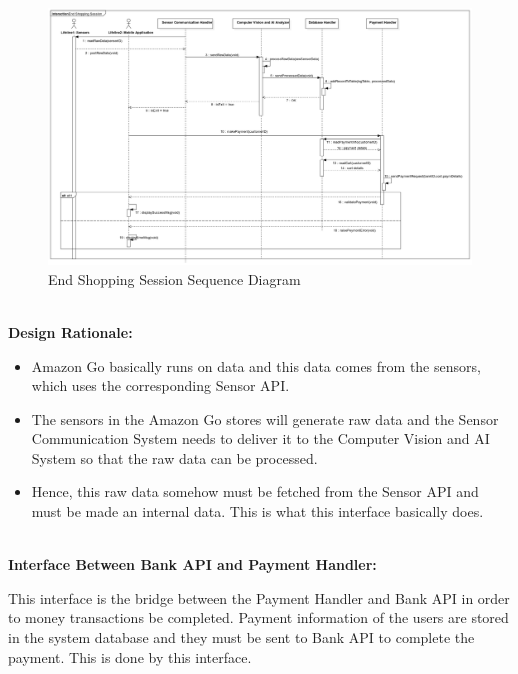\documentclass[11pt]{article}
\begin{document}
    \begin{center}
        \begin{figure}[H]
            \includegraphics[width=\linewidth]{Images/EndShoppingSessionSeq.png}  %
            \caption{End Shopping Session Sequence Diagram}
            \label{essd}
        \end{figure}
    \end{center}


   
    \textbf{\\Design Rationale:}
    \begin{itemize}
        \item Amazon Go basically runs on data and this data comes from the sensors, which uses the corresponding Sensor API.
        \item The sensors in the Amazon Go stores will generate raw data and the Sensor Communication System needs to deliver it to the Computer Vision and AI System so that the raw data can be processed. 
        \item Hence, this raw data somehow must be fetched from the Sensor API and must be made an internal data. This is what this interface basically does.

    \end{itemize}

   


    \textbf{\\Interface Between Bank API and Payment Handler:\\}
        
    This interface is the bridge between the Payment Handler and Bank API in order to money transactions be completed. Payment information of the users are stored in the system database and they must be sent 
    to Bank API to complete the payment. This is done by this interface. 
\end{document}
